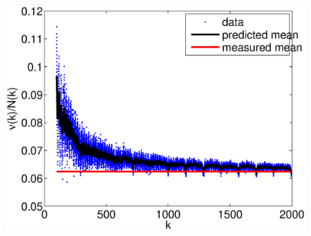 \documentclass{report}
\begin{document}
\begin{figure}
  \begin{center}
    \includegraphics[width=\textwidth]{figs/results/perc_100_to_2000_mean.eps}
  \end{center}
\end{figure}
\end{document}
